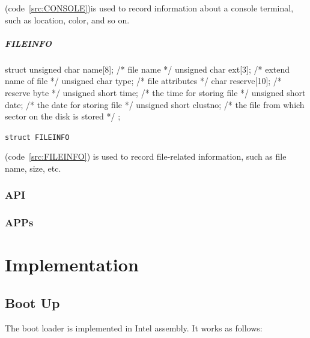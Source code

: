 \documentclass{swfcthesis}
\begin{document}
(code~\ref{src:CONSOLE})is used to record information about a console terminal, such as location,
color, and so on.




\paragraph{FILEINFO}

\begin{listing}[H]
  \begin{codeblock}
\begin{ccode}
struct 
{ 
  unsigned char name[8];   /* file name */
  unsigned char ext[3];    /* extend name of file */
  unsigned char type;      /* file attributes */
  char reserve[10];        /* reserve byte */
  unsigned short time;     /* the time for storing file */
  unsigned short date;     /* the date for storing file */
  unsigned short  clustno; /* the file from which sector on the disk is stored */
};
\end{ccode}
  \end{codeblock}
  \caption{\texttt{struct FILEINFO}}\label{src:FILEINFO}
\end{listing}

(code~\ref{src:FILEINFO}) is used to record file-related information, such as file name, size,
etc.
\fi %


    
\subsection{API}
\label{sec:api}

\subsection{APPs}
\label{sec:apps-1}



\chapter{Implementation}

\section{Boot Up}
\label{sec:boot-up-1}

The boot loader is implemented in Intel assembly. It works as follows:
\end{document}
